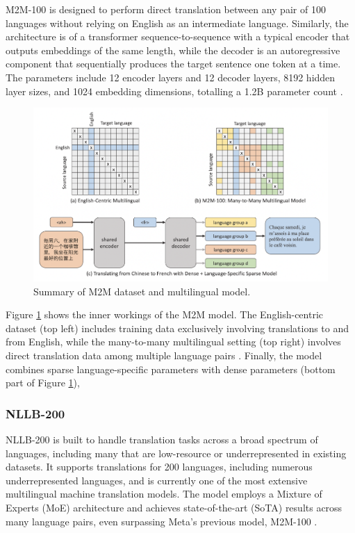 \documentclass[a4paper, 11pt]{article}
\begin{document}
M2M-100 \cite{fan-2020-m2m100} is designed to perform direct translation between any pair of 100 languages without relying on English as an intermediate language. Similarly, the architecture is of a transformer sequence-to-sequence with a typical encoder that outputs embeddings of the same length, while the decoder is an autoregressive component that sequentially produces the target sentence one token at a time. The parameters include 12 encoder layers and 12 decoder layers, 8192 hidden layer sizes, and 1024 embedding dimensions, totalling a 1.2B parameter count \cite{fan-2020-m2m100}.

\begin{figure}[htbp]
    \centering
    \includegraphics[width=0.9\linewidth]{images/m2m.png}
    \caption{Summary of M2M dataset and multilingual model.}
    \label{fig:m2m}
\end{figure}

Figure \ref{fig:m2m} shows the inner workings of the M2M model. The English-centric dataset (top left) includes training data exclusively involving translations to and from English, while the many-to-many multilingual setting (top right) involves direct translation data among multiple language pairs \cite{fan-2020-m2m100}. Finally, the model combines sparse language-specific parameters with dense parameters (bottom part of Figure \ref{fig:m2m}),

\subsubsection{NLLB-200}

NLLB-200 \cite{nllb200-2020} is built to handle translation tasks across a broad spectrum of languages, including many that are low-resource or underrepresented in existing datasets. It supports translations for 200 languages, including numerous underrepresented languages, and is currently one of the most extensive multilingual machine translation models. The model employs a Mixture of Experts (MoE) architecture and achieves state-of-the-art (SoTA) results across many language pairs, even surpassing Meta's previous model, M2M-100 \cite{nllb200-2020}.
\end{document}
